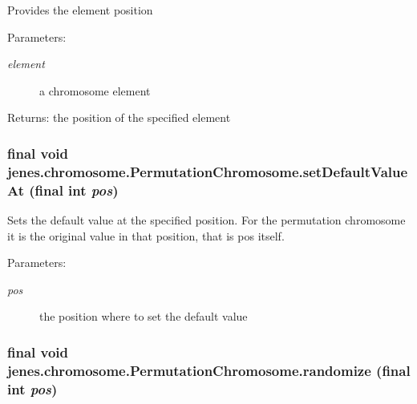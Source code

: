 Provides the element position

\begin{Desc}
\item[Parameters:]
\begin{description}
\item[{\em element}]a chromosome element \end{description}
\end{Desc}
\begin{Desc}
\item[Returns:]the position of the specified element \end{Desc}
\hypertarget{classjenes_1_1chromosome_1_1_permutation_chromosome_10210f11733f4d94e2743112179a2bf6}{
\subsubsection[setDefaultValueAt]{\setlength{\rightskip}{0pt plus 5cm}final void jenes.chromosome.PermutationChromosome.setDefaultValueAt (final int {\em pos})}}
\label{classjenes_1_1chromosome_1_1_permutation_chromosome_10210f11733f4d94e2743112179a2bf6}


Sets the default value at the specified position. For the permutation chromosome it is the original value in that position, that is pos itself.

\begin{Desc}
\item[Parameters:]
\begin{description}
\item[{\em pos}]the position where to set the default value \end{description}
\end{Desc}
\hypertarget{classjenes_1_1chromosome_1_1_permutation_chromosome_ea4acb031fb2b00f579be5c448825c47}{
\subsubsection[randomize]{\setlength{\rightskip}{0pt plus 5cm}final void jenes.chromosome.PermutationChromosome.randomize (final int {\em pos})}}
\label{classjenes_1_1chromosome_1_1_permutation_chromosome_ea4acb031fb2b00f579be5c448825c47}


